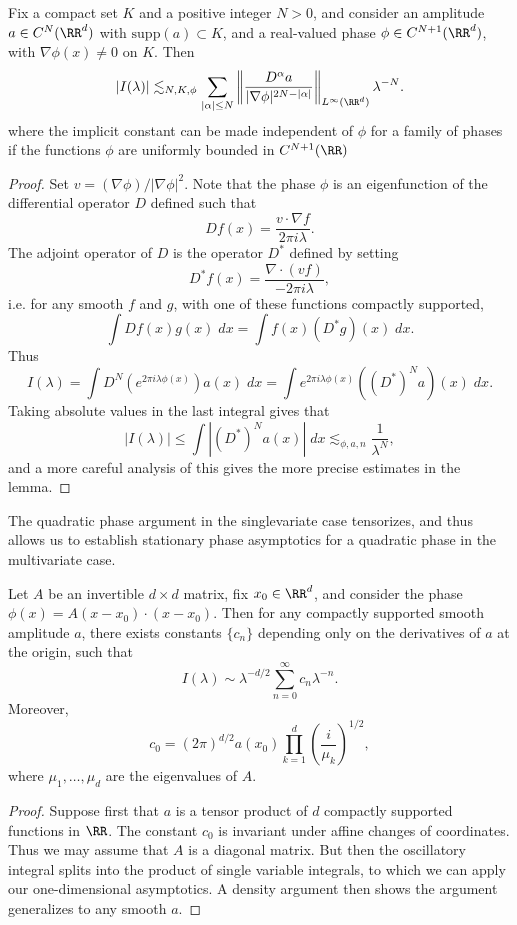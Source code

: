\begin{theorem}
    Fix a compact set $K$ and a positive integer $N > 0$, and consider an amplitude $a \in C^N(\RR^d)$ with $\text{supp}(a) \subset K$, and a real-valued phase $\phi \in C^{N+1}(\RR^d)$, with $\nabla \phi(x) \neq 0$ on $K$. Then
    \[ |I(\lambda)| \lesssim_{N,K,\phi} \sum_{|\alpha| \leq N} \left\| \frac{D^\alpha a}{|\nabla \phi|^{2N - |\alpha|}} \right\|_{L^\infty(\RR^d)} \lambda^{-N}. \]
    where the implicit constant can be made independent of $\phi$ for a family of phases if the functions $\phi$ are uniformly bounded in $C^{N+1}(\RR)$
\end{theorem}
\begin{proof}
    Set $v = (\nabla \phi)/|\nabla \phi|^2$. Note that the phase $\phi$ is an eigenfunction of the differential operator $D$ defined such that
    \[ Df(x) = \frac{v \cdot \nabla f}{2 \pi i \lambda}. \]
    The adjoint operator of $D$ is the operator $D^*$ defined by setting
    \[ D^*f(x) = \frac{\nabla \cdot (vf)}{-2 \pi i\lambda}, \]
    i.e. for any smooth $f$ and $g$, with one of these functions compactly supported,
    \[ \int Df(x) g(x)\; dx = \int f(x) (D^*g)(x)\; dx. \]
    Thus
    \[ I(\lambda) = \int D^N(e^{2 \pi i \lambda \phi(x)}) a(x)\; dx = \int e^{2 \pi i \lambda \phi(x)} ((D^*)^N a)(x)\; dx. \]
    Taking absolute values in the last integral gives that
    \[ |I(\lambda)| \leq \int |(D^*)^N a(x)|\; dx \lesssim_{\phi,a,n} \frac{1}{\lambda^N}, \]
    and a more careful analysis of this gives the more precise estimates in the lemma.
\end{proof}

The quadratic phase argument in the singlevariate case tensorizes, and thus allows us to establish stationary phase asymptotics for a quadratic phase in the multivariate case.

\begin{theorem}
  Let $A$ be an invertible $d \times d$ matrix, fix $x_0 \in \RR^d$, and consider the phase $\phi(x) = A(x - x_0) \cdot (x - x_0)$. Then for any compactly supported smooth amplitude $a$, there exists constants $\{ c_n \}$ depending only on the derivatives of $a$ at the origin, such that
  \[ I(\lambda) \sim \lambda^{-d/2} \sum_{n = 0}^\infty c_n \lambda^{-n}. \]
  Moreover,
  \[ c_0 = (2\pi)^{d/2} a(x_0) \prod_{k = 1}^d \left( \frac{i}{\mu_k} \right)^{1/2}, \]
  where $\mu_1, \dots, \mu_d$ are the eigenvalues of $A$.
\end{theorem}
\begin{proof}
  Suppose first that $a$ is a tensor product of $d$ compactly supported functions in $\RR$. The constant $c_0$ is invariant under affine changes of coordinates. Thus we may assume that $A$ is a diagonal matrix. But then the oscillatory integral splits into the product of single variable integrals, to which we can apply our one-dimensional asymptotics. A density argument then shows the argument generalizes to any smooth $a$.
\end{proof}

